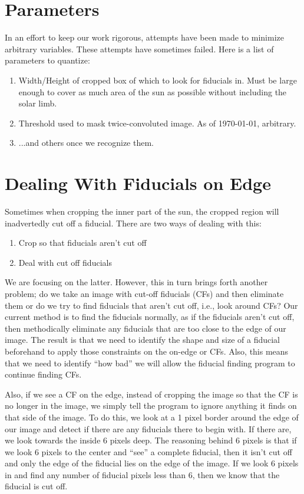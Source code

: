 \documentclass[10pt]{article}
\begin{document}
\section{Parameters}
    In an effort to keep our work rigorous, attempts have been made to minimize arbitrary variables. These attempts have sometimes failed. Here is a list of parameters to quantize:
    \begin{enumerate}
        \item Width/Height of cropped box of which to look for fiducials in. Must be large enough to cover as much area of the sun as possible without including the solar limb.
        \item Threshold used to mask twice-convoluted image. As of \today, arbitrary.
        \item ...and others once we recognize them.
    \end{enumerate}

\section{Dealing With Fiducials on Edge} %
\label{sec:dealing_witb_fiducials_on_edge}
    Sometimes when cropping the inner part of the sun, the cropped region will inadvertedly cut off a fiducial. There are two ways of dealing with this:

    \begin{enumerate}
         \item Crop so that fiducials aren't cut off
         \item Deal with cut off fiducials
     \end{enumerate} 

     We are focusing on the latter. However, this in turn brings forth another problem; do we take an image with cut-off fiducials (CFs) and then eliminate them or do we try to find fiducials that aren't cut off, i.e., look around CFs? Our current method is to find the fiducials normally, as if the fiducials aren't cut off, then methodically eliminate any fiducials that are too close to the edge of our image. The result is that we need to identify the shape and size of a fiducial beforehand to apply those constraints on the on-edge or CFs. Also, this means that we need to identify ``how bad'' we will allow the fiducial finding program to continue finding CFs.

     Also, if we see a CF on the edge, instead of cropping the image so that the CF is no longer in the image, we simply tell the program to ignore anything it finds on that side of the image. To do this, we look at a 1 pixel border around the edge of our image and detect if there are any fiducials there to begin with. If there are, we look towards the inside 6 pixels deep. The reasoning behind 6 pixels is that if we look 6 pixels to the center and ``see'' a complete fiducial, then it isn't cut off and only the edge of the fiducial lies on the edge of the image. If we look 6 pixels in and find any number of fiducial pixels less than 6, then we know that the fiducial is cut off. 
\end{document}
